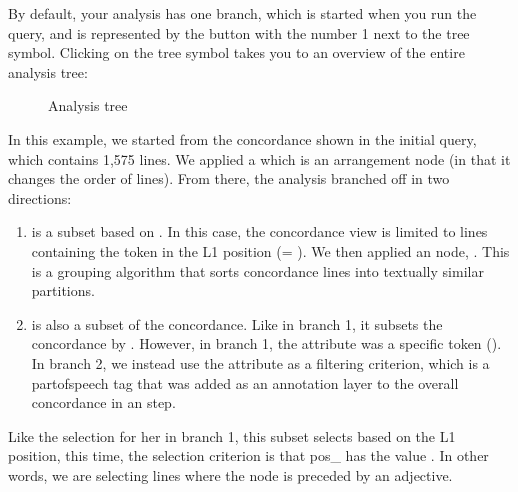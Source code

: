 \documentclass[letterpaper,10pt,english]{sphinxmanual}
\begin{document}
\sphinxAtStartPar
By default, your analysis has one branch, which is started when you run
the query, and is represented by the button with the number 1 next to
the tree symbol. Clicking on the tree symbol takes you to an overview of
the entire analysis tree:

\begin{figure}[htbp]
\centering
\capstart

\noindent{}
\caption{Analysis tree}\label{\detokenize{clicanalysis/flexiconc:id4}}\label{\detokenize{clicanalysis/flexiconc:flexiclic-tree}}\end{figure}

\sphinxAtStartPar
In this example, we started from the concordance shown in the initial
query, which contains 1,575 lines. We applied a  \textendash{} which
is an arrangement node (in that it changes the order of lines). From
there, the analysis branched off in two directions:
\begin{enumerate}
%
\item {} 
\sphinxAtStartPar
{} is a subset based on . In this case, the concordance view is limited to lines
containing the token  in the L1 position (= ). We
then applied an  node, .
This is a grouping algorithm that sorts concordance lines into
textually similar partitions.

\item {} 
\sphinxAtStartPar
{} is also a subset of the concordance. Like in branch 1,
it subsets the concordance by .
However, in branch 1, the attribute was a specific token (). In
branch 2, we instead use the attribute  as a filtering
criterion, which is a part\sphinxhyphen{}of\sphinxhyphen{}speech tag that was added as an
annotation layer to the overall concordance in an  step.

\end{enumerate}

\sphinxAtStartPar
Like the selection for her in branch 1, this subset selects based on the
L1 position, this time, the selection criterion is that pos\_ has the
value . In other words, we are selecting lines where the node is
preceded by an adjective.
\end{document}

